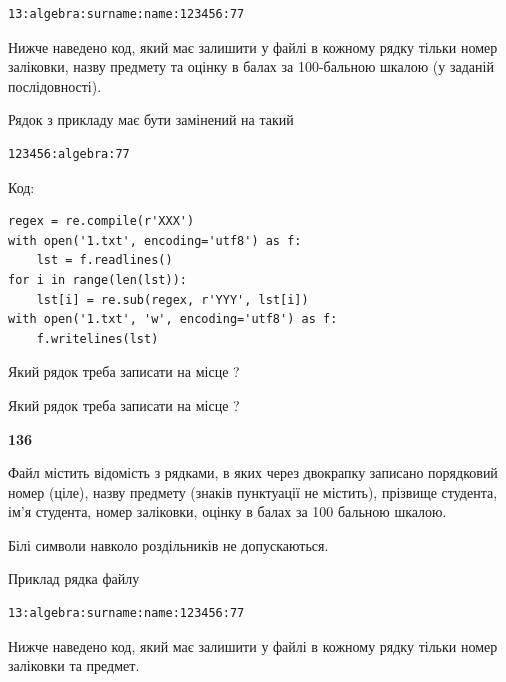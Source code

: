 \begin{verbatim}
13:algebra:surname:name:123456:77
\end{verbatim}


Нижче наведено код, який має залишити у файлі в кожному рядку тільки номер заліковки, назву предмету та оцінку в балах за 100-бальною шкалою (у заданій послі\-дов\-ності).

Рядок з прикладу має бути замінений на такий



\begin{verbatim}
123456:algebra:77
\end{verbatim}




Код:



\begin{verbatim}
regex = re.compile(r'XXX')
with open('1.txt', encoding='utf8') as f:
    lst = f.readlines()
for i in range(len(lst)):
    lst[i] = re.sub(regex, r'YYY', lst[i])
with open('1.txt', 'w', encoding='utf8') as f:
    f.writelines(lst)
\end{verbatim}







Який рядок треба записати на місце  ?\par
\vspace{5mm}


Який рядок треба записати на місце  ?\par


\newpage

{\begin {center}\textbf{ 136}\end {center}}\par
Файл  містить відомість з рядками, в яких через двокрапку записано поряд\-ковий номер (ціле), назву предмету (знаків пунктуації не містить), прізвище студента, ім'я студента, номер заліковки, оцінку в балах за 100 бальною шкалою.

Білі символи навколо роздільників не допускаються.

Приклад рядка файлу



\begin{verbatim}
13:algebra:surname:name:123456:77
\end{verbatim}


Нижче наведено код, який має залишити у файлі в кожному рядку тільки номер заліковки та предмет.

